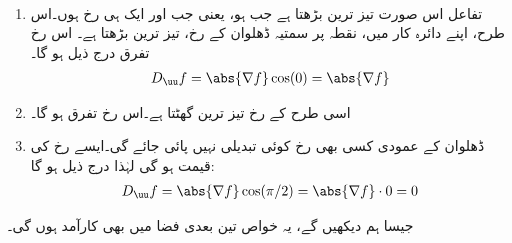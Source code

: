 \\
\begin{enumerate}[1.]
\item
تفاعل  اس صورت تیز ترین بڑھتا ہے جب  ہو، یعنی جب  اور  ایک ہی رخ ہوں۔اس طرح، اپنے دائرہ کار میں، نقطہ  پر  سمتیہ ڈھلوان  کے رخ،    تیز ترین بڑھتا ہے۔ اس رخ تفرق درج ذیل ہو گا۔
\begin{align*}
D_{\uu}f=\abs{\nabla f}\cos(0)=\abs{\nabla f}
\end{align*}
\item
اسی طرح   کے رخ    تیز ترین  گھٹتا ہے۔اس رخ تفرق  ہو گا۔
\item
ڈھلوان کے عمودی  کسی بھی رخ   کوئی تبدیلی نہیں پائی جائے گی۔ایسے رخ  کی قیمت  ہو گی  لہٰذا درج ذیل ہو گا:
\begin{align*}
D_{\uu}f=\abs{\nabla f}\cos(\pi/2)=\abs{\nabla f}\cdot 0 =0
\end{align*}
\end{enumerate}

جیسا ہم دیکھیں گے، یہ خواص تین بعدی فضا میں بھی کارآمد  ہوں گی۔

